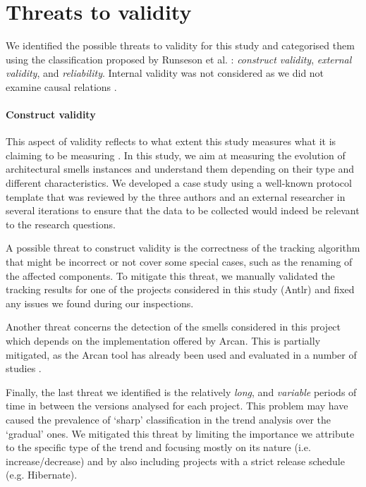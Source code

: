 
\section{Threats to validity}\label{c3:sec:threats}
We identified the possible threats to validity for this study and categorised them using the classification proposed by Runseson et al. \cite{Runeson2012}: \emph{construct validity}, \emph{external validity}, and \emph{reliability}.
Internal validity was not considered as we did not examine causal relations \cite{Runeson2012}.

\paragraph{Construct validity}
This aspect of validity reflects to what extent this study measures what it is claiming to be measuring \cite{Runeson2012}.
In this study, we aim at measuring the evolution of architectural smells instances and understand them depending on their type and different characteristics.
We developed a case study using a well-known protocol template \cite{Brereton2008} that was reviewed by the three authors and an external researcher in several iterations to ensure that the data to be collected would indeed be relevant to the research questions.

A possible threat to construct validity  is the correctness of the tracking algorithm that might be incorrect or not cover some special cases, such as the renaming of the affected components.
To mitigate this threat, we manually validated the tracking results for one of the projects considered in this study (Antlr) and fixed any issues we found during our inspections.

Another threat concerns the detection of the smells considered in this project which depends on the implementation offered by Arcan. This is partially mitigated, as the Arcan tool has already been used and evaluated in a number of studies \cite{Arcelli2016, Biaggi2018}.

Finally, the last threat we identified is the relatively \emph{long}, and \emph{variable} periods of time in between the versions analysed for each project. This problem may have caused the prevalence of `sharp' classification in the trend analysis over the `gradual' ones.
We mitigated this threat by limiting the importance we attribute to the specific type of the trend and focusing mostly on its nature (i.e. increase/decrease) and by also including projects with a strict release schedule (e.g. Hibernate).

